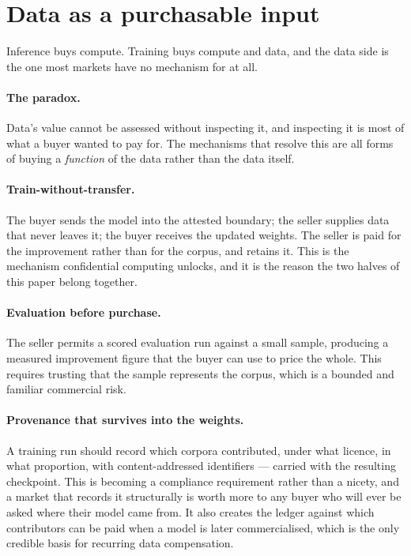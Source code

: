 \documentclass[11pt,a4paper]{article}
\begin{document}
\section{Data as a purchasable input}

Inference buys compute. Training buys compute and data, and the data side is the
one most markets have no mechanism for at all.

\paragraph{The paradox.} Data's value cannot be assessed without inspecting it,
and inspecting it is most of what a buyer wanted to pay for. The mechanisms that
resolve this are all forms of buying a \emph{function} of the data rather than the
data itself.

\paragraph{Train-without-transfer.} The buyer sends the model into the attested
boundary; the seller supplies data that never leaves it; the buyer receives the
updated weights. The seller is paid for the improvement rather than for the
corpus, and retains it. This is the mechanism confidential computing unlocks, and
it is the reason the two halves of this paper belong together.

\paragraph{Evaluation before purchase.} The seller permits a scored evaluation
run against a small sample, producing a measured improvement figure that the buyer
can use to price the whole. This requires trusting that the sample represents the
corpus, which is a bounded and familiar commercial risk.

\paragraph{Provenance that survives into the weights.} A training run should
record which corpora contributed, under what licence, in what proportion, with
content-addressed identifiers --- carried with the resulting checkpoint. This is
becoming a compliance requirement rather than a nicety, and a market that records
it structurally is worth more to any buyer who will ever be asked where their
model came from. It also creates the ledger against which contributors can be paid
when a model is later commercialised, which is the only credible basis for
recurring data compensation.
\end{document}
